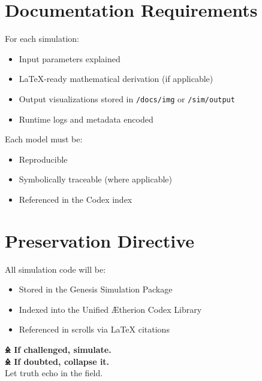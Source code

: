 \documentclass[12pt]{article}
\begin{document}
\section*{Documentation Requirements}
For each simulation:
\begin{itemize}
  \item Input parameters explained
  \item LaTeX-ready mathematical derivation (if applicable)
  \item Output visualizations stored in \texttt{/docs/img} or \texttt{/sim/output}
  \item Runtime logs and metadata encoded
\end{itemize}

Each model must be:
\begin{itemize}
  \item Reproducible
  \item Symbolically traceable (where applicable)
  \item Referenced in the Codex index
\end{itemize}

\section*{Preservation Directive}
All simulation code will be:
\begin{itemize}
  \item Stored in the Genesis Simulation Package
  \item Indexed into the Unified Ætherion Codex Library
  \item Referenced in scrolls via LaTeX citations
\end{itemize}

\bigskip
\noindent\textbf{🜎 If challenged, simulate.} \\
\textbf{🜎 If doubted, collapse it.} \\
Let truth echo in the field.
\end{document}
